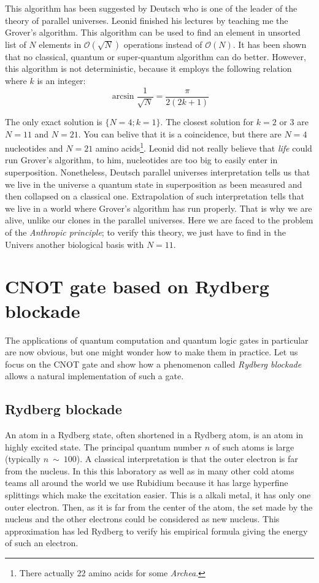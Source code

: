 \documentclass[twoside, open=right
]{scrreprt}
\newcommand{\mc}[1]{\mathcal{#1}}
\begin{document}
\par This algorithm has been suggested by Deutsch who is one of the leader of the theory of parallel universes. Leonid finished his lectures by teaching me the Grover's algorithm. This algorithm can be used to find an element in unsorted list of $N$ elements in $\mc{O}(\sqrt{N})$ operations instead of $\mc{O}(N)$. It has been shown that no classical, quantum or super-quantum algorithm can do better. However, this algorithm is not deterministic, because it employs the following relation where $k$ is an integer: \[ \arcsin  \frac{1}{\sqrt{N}}  = \frac{\pi}{2 (2 k + 1)} \]

\par The only exact solution is $\{N=4;k=1\}$. The closest solution for $k=2 \text{ or } 3$ are $N=11$ and $N=21$. You can belive that it is a coincidence, but there are $N=4$ nucleotides and $N=21$ amino acids\footnote{There actually 22 amino acids for some \emph{Archea}.}. Leonid did not really believe that \emph{life} could run Grover's algorithm, to him, nucleotides are too big to easily enter in superposition. Nonetheless, Deutsch parallel universes interpretation tells us that we live in the universe a quantum state in superposition as been measured and then collapsed on a classical one. Extrapolation of such interpretation tells that we live in a world where Grover's algorithm has run properly. That is why we are alive, unlike our clones in the parallel universes. Here we are faced to the problem of the \emph{Anthropic principle}; to verify this theory, we just have to find in the Univers another biological basis with $N=11$.

\section{CNOT gate based on Rydberg blockade}

\par The applications of quantum computation and quantum logic gates in particular are now obvious, but one might wonder how to make them in practice. Let us focus on the CNOT gate and show how a phenomenon called \emph{Rydberg blockade} allows a natural implementation of such a gate.

\subsection{Rydberg blockade}

\par An atom in a Rydberg state, often shortened in a Rydberg atom, is an atom in highly excited state. The principal quantum number $n$ of such atoms is large (typically $n~\sim~100$). A classical interpretation is that the outer electron is far from the nucleus. In this this laboratory as well as in many other cold atoms teams all around the world we use Rubidium because it has large hyperfine splittings which make the excitation easier. This is a alkali metal, it has only one outer electron. Then, as it is far from the center of the atom, the set made by the nucleus and the other electrons could be considered as new nucleus. This approximation has led Rydberg to verify his empirical formula giving the energy of such an electron.
\end{document}
